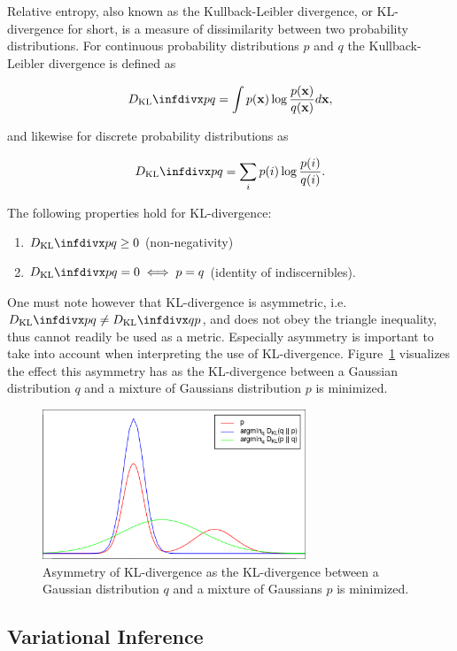 Relative entropy, also known as the Kullback-Leibler divergence, or KL-divergence for short, is a measure of dissimilarity between two probability distributions. For continuous probability distributions $p$ and $q$ the Kullback-Leibler divergence is defined as

$$\dkl{p}{q} = \int p(\mathbf{x}) \log \frac{p(\mathbf{x})}{q(\mathbf{x})} d\mathbf{x},$$

and likewise for discrete probability distributions as

$$\dkl{p}{q} = \sum_{i} p(i) \log \frac{p(i)}{q(i)}.$$

The following properties hold for KL-divergence:

\begin{enumerate}
\item $\dkl{p}{q} \geq 0$ (non-negativity)
\item $\dkl{p}{q} = 0 \iff p = q$ (identity of indiscernibles).
\end{enumerate}

One must note however that KL-divergence is asymmetric, i.e. $\dkl{p}{q} \neq \dkl{q}{p}$, and does not obey the triangle inequality, thus cannot readily be used as a metric. Especially asymmetry is important to take into account when interpreting the use of KL-divergence. Figure~\ref{fig:kl_divergence} visualizes the effect this asymmetry has as the KL-divergence between a Gaussian distribution $q$ and a mixture of Gaussians distribution $p$ is minimized.

\begin{figure}[!htb]
  \centering
  \includegraphics[width=0.7\textwidth]{images/kl_divergence.png}
  \caption{Asymmetry of KL-divergence as the KL-divergence between a Gaussian distribution $q$ and a mixture of Gaussians $p$ is minimized.}
  \label{fig:kl_divergence}
\end{figure}

\subsection{Variational Inference}
\label{subsection:variational_inference}

